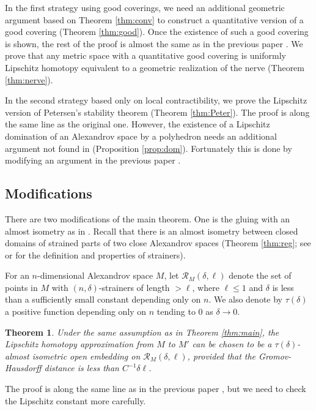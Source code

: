 \documentclass[a4paper,12pt]{amsart}
\theoremstyle{plain}
\newtheorem{thm}{Theorem}
\theoremstyle{definition}
\numberwithin{thm}{section}
\numberwithin{equation}{section}
\begin{document}
In the first strategy using good coverings, we need an additional geometric argument based on Theorem \ref{thm:conv} to construct a quantitative version of a good covering (Theorem \ref{thm:good}).
Once the existence of such a good covering is shown, the rest of the proof is almost the same as in the previous paper \cite{MY:lip}.
We prove that any metric space with a quantitative good covering is uniformly Lipschitz homotopy equivalent to a geometric realization of the nerve (Theorem \ref{thm:nerve}).

In the second strategy based only on local contractibility, we prove the Lipschitz version of Petersen's stability theorem \cite[Theorem A]{Peter} (Theorem \ref{thm:Peter}).
The proof is along the same line as the original one.
However, the existence of a Lipschitz domination of an Alexandrov space by a polyhedron needs an additional argument not found in \cite{Peter} (Proposition \ref{prop:dom}).
Fortunately this is done by modifying an argument in the previous paper \cite{MY:lip}.

\subsection{Modifications}

There are two modifications of the main theorem.
One is the gluing with an almost isometry as in \cite[1.4]{MY:lip}.
Recall that there is an almost isometry between closed domains of strained parts of two close Alexandrov spaces (Theorem \ref{thm:reg}; see \cite[\S2.3]{MY:lip} or \cite{BGP} for the definition and properties of strainers).

For an $n$-dimensional Alexandrov space $M$, let $\mathcal R_M(\delta,\ell)$ denote the set of points in $M$ with $(n,\delta)$-strainers of length $>\ell$, where $\ell\le 1$ and $\delta$ is less than a sufficiently small constant depending only on $n$.
We also denote by $\tau(\delta)$ a positive function depending only on $n$ tending to $0$ as $\delta\to0$.

\begin{thm}\label{thm:isom}
Under the same assumption as in Theorem \ref{thm:main}, the Lipschitz homotopy approximation from $M$ to $M'$ can be chosen to be a $\tau(\delta)$-almost isometric open embedding on $\mathcal R_M(\delta,\ell)$, provided that the Gromov-Hausdorff distance is less than $C^{-1}\delta\ell$.
\end{thm}

The proof is along the same line as in the previous paper \cite{MY:lip}, but we need to check the Lipschitz constant more carefully.
\end{document}
